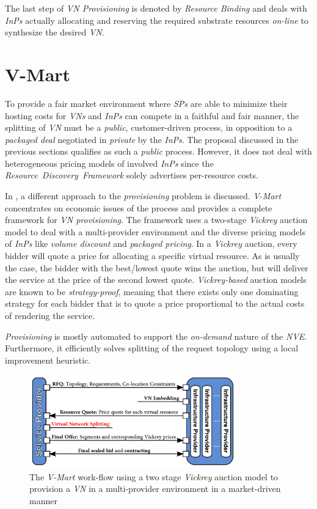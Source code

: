 \documentclass[prodmode,acmtomccap]{acmlarge}
\begin{document}
The last step of \emph{VN Provisioning} is denoted by \emph{Resource Binding} and deals with \emph{InPs} actually allocating and reserving the required substrate resources \emph{on-line} to synthesize
the desired \emph{VN}.

\section{V-Mart}
\label{sec:vmart}
To provide a fair market environment where \emph{SPs} are able to minimize their hosting costs for \emph{VNs} and \emph{InPs} can compete in a faithful and fair manner,
the splitting of \emph{VN} must be a \emph{public}, customer-driven process, in opposition to a \emph{packaged deal} negotiated in \emph{private} by the \emph{InPs}.
The proposal discussed in the previous sections qualifies as such a \emph{public} process. However, it does not deal with heterogeneous pricing models of involved \emph{InPs} since
the \emph{Resource~Discovery~Framework} solely advertises per-resource costs.

In , a different approach to the \emph{provisioning} problem is discussed. \emph{V-Mart} concentrates on economic issues of the 
process and provides a complete framework for \emph{VN provisioning}.
The framework uses a two-stage \emph{Vickrey} auction model to deal with a multi-provider environment and the diverse pricing models of \emph{InPs} like 
\emph{volume discount} and \emph{packaged pricing}. In a \emph{Vickrey} auction, every bidder will quote a price for allocating a specific virtual resource. As is usually the case, 
the bidder with the best/lowest quote wins the auction, but will deliver the service at the price of the second lowest quote. \emph{Vickrey-based} auction models are known to be \emph{strategy-proof},
meaning that there exists only one dominating strategy for each bidder that is to quote a price proportional to the actual costs of rendering the service.

\emph{Provisioning} is mostly automated to support the \emph{on-demand} nature of the \emph{NVE}. Furthermore, it
efficiently solves splitting of the request topology using a local improvement heuristic.

\begin{figure}[htb]
	\centering
	\includegraphics[width=0.8\textwidth]{vmart}
	\caption{The \emph{V-Mart} work-flow using a two stage \emph{Vickrey} auction model to provision a \emph{VN} in a multi-provider environment in a market-driven manner}
	\label{fig7}
\end{figure}
\end{document}
